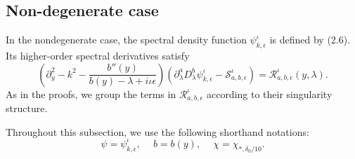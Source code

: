 \documentclass[reqno,11pt]{amsart}
\numberwithin{equation}{section}
\numberwithin{equation}{section} %
\begin{document}
\subsection{Non-degenerate case}
In the nondegenerate case, the spectral density function $\psi_{k,\epsilon}^{\iota}$ is defined by (2.6). Its higher-order spectral derivatives satisfy
\begin{equation*}
    \left(\partial_y^2-k^2-\frac{b''(y)}{b(y)-\lambda+i\iota\epsilon}\right)\left(\partial_\lambda^a D_\lambda^b \psi_{k,\epsilon}^{\iota}-\mathcal{S}_{a,b,\epsilon}^\iota\right)=\mathcal{R}^\iota_{a,b,\epsilon}(y,\lambda).
\end{equation*}
As in the proofs, we group the terms in $\mathcal{R}^\iota_{a,b,\epsilon}$ according to their singularity structure.

Throughout this subsection, we use the following shorthand notations:
\begin{equation*}
  \psi=\psi_{k,\epsilon}^\iota,\quad\ b=b(y),\quad\ \chi=\chi_{\ast,\delta_0/10}.
\end{equation*}
\end{document}
